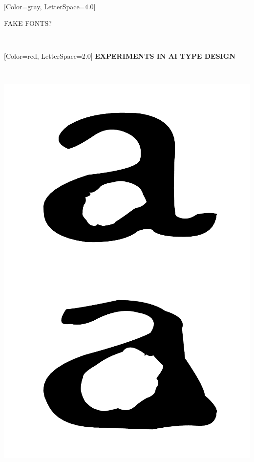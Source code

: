 \documentclass{article}
\begin{document}
\begin{minipage}[c]{20in}
{ 
[Color=gray, LetterSpace=4.0]
\fontsize{2.7in}{0.5in}\selectfont 
\bfseries

FAKE FONTS?
}\vspace{0.4in}\\
{ 
[Color=red, LetterSpace=2.0]
\fontsize{1.8in}{0.5in}\selectfont 
\bfseries
\vspace{0.5in}
EXPERIMENTS IN AI TYPE DESIGN

}
\end{minipage}
\vspace{0in}\\
\colorbox{white}{
\begin{minipage}{21.5in}
\includegraphics[width=6.5in,trim=40 0 40 0,clip]{a.pdf}
\includegraphics[width=6.5in,trim=40 0 40 0,clip]{a2.pdf}

\end{minipage}}
\end{document}

